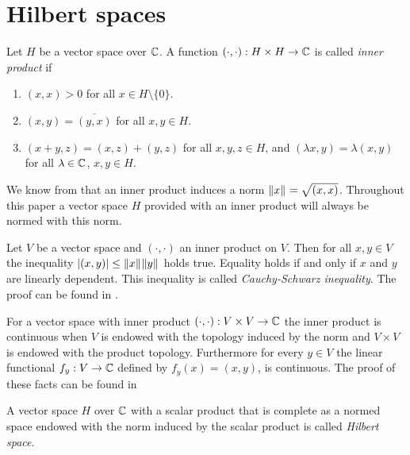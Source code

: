 \section{Hilbert spaces}

\begin{definition}
	Let $H$ be a vector space over $\mathbb C$. A function $(\cdot, \cdot): H \times H \to \mathbb C$ is called \textit{inner product} if 
	\begin{enumerate}
		\item $(x,x) > 0$ for all $x \in H \setminus \{0\}$.
		\item $(x,y) = \overline{(y,x)}$ for all $x,y \in H$.
		\item $(x + y, z) = (x,z) + (y,z)$ for all $x,y,z \in H$, and $(\lambda x, y) = \lambda (x,y)$ for all $\lambda \in \mathbb C$, $x,y \in H$. 
	\end{enumerate}
\end{definition}


\begin{remark}
	We know from \cite[p.41]{FAna1} that an inner product induces a norm ${\left \| x \right \|}_{} = \sqrt{{\left ( x, x \right )}}$. Throughout this paper a vector space $H$ provided with an inner product will always be normed with this norm.
\end{remark}


\begin{remark} \label{remark:csb}
	Let $V$ be a vector space and $(\cdot, \cdot)$ an inner product on $V$. Then for all $x,y \in V$ the inequality ${\left | (x,y) \right |} \leq {\left \| x \right \|}_{} {\left \| y \right \|}_{}$ holds true. Equality holds if and only if $x$ and $y$ are linearly dependent. This inequality is called \textit{Cauchy-Schwarz inequality}. The proof can be found in \cite[p. 41]{FAna1}.
\end{remark}


\begin{remark} \label{remark:inner_product_continuity}
	For a vector space with inner product $(\cdot, \cdot): V \times V \to \mathbb C$ the inner product is continuous when $V$ is endowed with the topology induced by the norm and $V \times V$ is endowed with the product topology. Furthermore for every $y \in V$ the linear functional $f_y:V \to \mathbb C$ defined by $f_y(x) = (x,y)$, is continuous. The proof of these facts can be found in \cite[p.43]{FAna1} 
\end{remark}

\begin{definition}
	A vector space $H$ over $\mathbb C$ with a scalar product that is complete as a normed space endowed with the norm induced by the scalar product is called \textit{Hilbert space}.
\end{definition}

